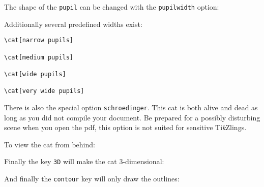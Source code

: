\documentclass[parskip=half]{scrartcl}
\newcommand{\tikzlings}{Ti\emph{k}Zlings\xspace}
\newcommand{\cathookbackground}{\path (-1.6,0.1) rectangle (0.905, 2.17);}
\begin{document}
The shape of the \lstinline|pupil| can be changed with the \lstinline|pupilwidth| option:
\begin{tcblisting}{}
\cat[pupilwidth=0.015]
\end{tcblisting}

Additionally several predefined widths exist:
\begin{tcolorbox}
\begin{lstlisting}[morekeywords={narrow,medium,wide,very,pupils}]
\cat[narrow pupils]

\cat[medium pupils]

\cat[wide pupils]

\cat[very wide pupils]
\end{lstlisting} 

\tcblower
{}
\end{tcolorbox}

There is also the special option \lstinline|schroedinger|. This cat is both alive and dead as long as you did not compile your document.
Be prepared for a possibly disturbing scene when you open the pdf, this option is not suited for sensitive \tikzlings.
\begingroup
\makeatletter
\renewcommand*{\cat}[1][]{%
    \tikzset{/cat/.cd,#1}%
    \cat@tombstone%
}
\renewcommand{\cathookbackground}{}
\makeatother
\begin{tcblisting}{}
\cat[schroedinger]
\end{tcblisting}
\endgroup

To view the cat from behind:
\begin{tcblisting}{}
\cat[back]
\end{tcblisting}

Finally the key \lstinline|3D| will make the cat 3-dimensional:
\begin{tcblisting}{}
\cat[3D]
\end{tcblisting}

And finally the \lstinline|contour| key will only draw the outlines:
\begin{tcblisting}{}
\cat[contour=black]
\end{tcblisting}

%
%
\clearpage
\end{document}
